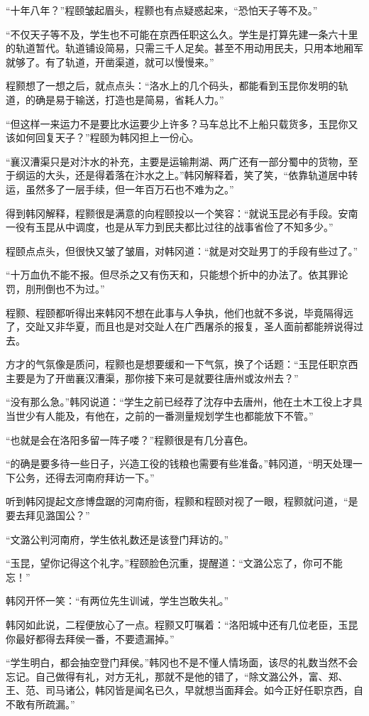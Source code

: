 “十年八年？”程颐皱起眉头，程颢也有点疑惑起来，“恐怕天子等不及。”

“不仅天子等不及，学生也不可能在京西任职这么久。学生是打算先建一条六十里的轨道暂代。轨道铺设简易，只需三千人足矣。甚至不用动用民夫，只用本地厢军就够了。有了轨道，开凿渠道，就可以慢慢来。”

程颢想了一想之后，就点点头：“洛水上的几个码头，都能看到玉昆你发明的轨道，的确是易于输送，打造也是简易，省耗人力。”

“但这样一来运力不是要比水运要少上许多？马车总比不上船只载货多，玉昆你又该如何回复天子？”程颐为韩冈担上一份心。

“襄汉漕渠只是对汴水的补充，主要是运输荆湖、两广还有一部分蜀中的货物，至于纲运的大头，还是得着落在汴水之上。”韩冈解释着，笑了笑，“依靠轨道居中转运，虽然多了一层手续，但一年百万石也不难为之。”

得到韩冈解释，程颢很是满意的向程颐投以一个笑容：“就说玉昆必有手段。安南一役有玉昆从中调度，也是从军力到民夫都比过往的战事省俭了不知多少。”

程颐点点头，但很快又皱了皱眉，对韩冈道：“就是对交趾男丁的手段有些过了。”

“十万血仇不能不报。但尽杀之又有伤天和，只能想个折中的办法了。依其罪论罚，刖刑倒也不为过。”

程颢、程颐都听得出来韩冈不想在此事与人争执，他们也就不多说，毕竟隔得远了，交趾又非华夏，而且也是对交趾人在广西屠杀的报复，圣人面前都能辨说得过去。

方才的气氛像是质问，程颢也是想要缓和一下气氛，换了个话题：“玉昆任职京西主要是为了开凿襄汉漕渠，那你接下来可是就要往唐州或汝州去？”

“没有那么急。”韩冈说道：“学生之前已经荐了沈存中去唐州，他在土木工役上才具当世少有人能及，有他在，之前的一番测量规划学生也都能放下不管。”

“也就是会在洛阳多留一阵子喽？”程颢很是有几分喜色。

“的确是要多待一些日子，兴造工役的钱粮也需要有些准备。”韩冈道，“明天处理一下公务，还得去河南府拜访一下。”

听到韩冈提起文彦博盘踞的河南府衙，程颢和程颐对视了一眼，程颢就问道，“是要去拜见潞国公？”

“文潞公判河南府，学生依礼数还是该登门拜访的。”

“玉昆，望你记得这个礼字。”程颐脸色沉重，提醒道：“文潞公忘了，你可不能忘！”

韩冈开怀一笑：“有两位先生训诫，学生岂敢失礼。”

韩冈如此说，二程便放心了一点。程颢又叮嘱着：“洛阳城中还有几位老臣，玉昆你最好都得去拜侯一番，不要遗漏掉。”

“学生明白，都会抽空登门拜侯。”韩冈也不是不懂人情场面，该尽的礼数当然不会忘记。自己做得有礼，对方无礼，那就不是他的错了，“除文潞公外，富、郑、王、范、司马诸公，韩冈皆是闻名已久，早就想当面拜会。如今正好任职京西，自不敢有所疏漏。”

